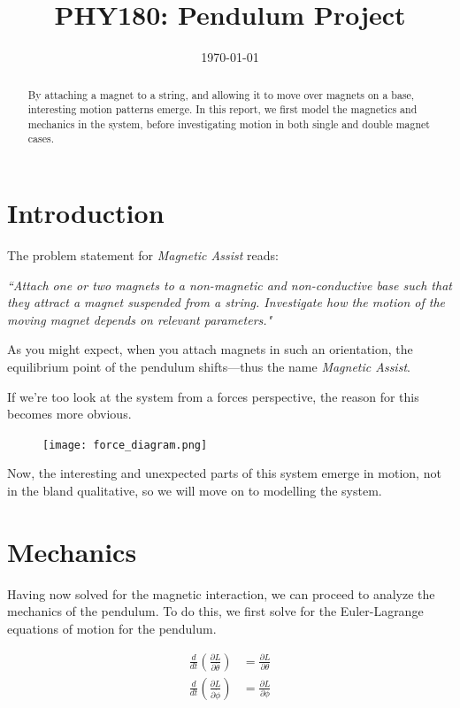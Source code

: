 \documentclass[prl,twocolumn,amsmath,amssymb,superscriptaddress]{revtex4-2}
\begin{document}
\title{PHY180: Pendulum Project}
\date{\today}

\begin{abstract}
By attaching a magnet to a string, and allowing it to move over magnets on a base, interesting motion patterns emerge. In this report, we first model the magnetics and mechanics in the system, before investigating motion in both single and double magnet cases.
\end{abstract}

\maketitle

\section{Introduction}
The problem statement for \textit{Magnetic Assist} reads:

\begin{center}
{\it ``Attach one or two magnets to a non-magnetic and non-conductive base such that they attract a magnet suspended from a string. Investigate how the motion of the moving magnet depends on relevant parameters."}
\end{center}

As you might expect, when you attach magnets in such an orientation, the equilibrium point of the pendulum shifts---thus the name \textit{Magnetic Assist}.

If we're too look at the system from a forces perspective, the reason for this becomes more obvious.

\begin{figure}[htb]
    \texttt{[image: force\_diagram.png]}
    \label{fig:Force diagram}
\end{figure}

Now, the interesting and unexpected parts of this system emerge in motion, not in the bland qualitative, so we will move on to modelling the system.

\section{Mechanics}
Having now solved for the magnetic interaction, we can proceed to analyze the mechanics of the pendulum. To do this, we first solve for the Euler-Lagrange equations of motion for the pendulum.

\begin{equation}
\begin{split}
    \frac{d}{dt}\left(\frac{\partial L}{\partial \dot{\theta}}\right) &= \frac{\partial L}{\partial \theta} \\
    \frac{d}{dt}\left(\frac{\partial L}{\partial \dot{\phi}}\right) &= \frac{\partial L}{\partial \phi}
\end{split}
\end{equation}
\end{document}
